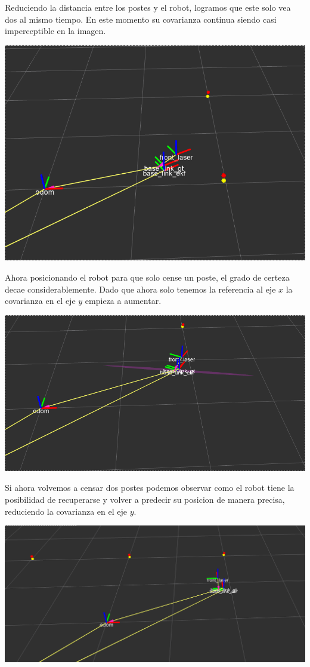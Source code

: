 Reduciendo la distancia entre los postes y el robot, logramos que este solo vea dos al mismo tiempo. En este momento su covarianza continua siendo casi imperceptible en la imagen.

\includegraphics[scale=0.3]{punto4/ekfViendoDosPostes.png}

Ahora posicionando el robot para que solo cense un poste, el grado de certeza decae considerablemente. Dado que ahora solo tenemos la referencia al eje $x$ la covarianza en el eje $y$ empieza a aumentar.

\includegraphics[scale=0.3]{punto4/ekfViendoUnPoste.png}

Si ahora volvemos a censar dos postes podemos observar como el robot tiene la posibilidad de recuperarse y volver a predecir su posicion de manera precisa, reduciendo la covarianza en el eje $y$.

\includegraphics[scale=0.3]{punto4/ekfViendoTresPostesOtraVez.png}

